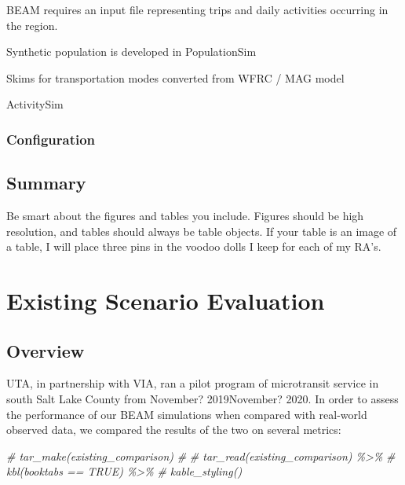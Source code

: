 \documentclass[
]{article}
\newenvironment{Shaded}{\begin{snugshade}}{\end{snugshade}}
\newcommand{\CommentTok}[1]{\textcolor[rgb]{0.56,0.35,0.01}{\textit{#1}}}
\begin{document}
BEAM requires an input file representing trips and daily activities occurring in the region.

Synthetic population is developed in PopulationSim

Skims for transportation modes converted from WFRC / MAG model

ActivitySim

\hypertarget{configuration}{%
\subsubsection{Configuration}\label{configuration}}

\hypertarget{summary-1}{%
\subsection{Summary}\label{summary-1}}

Be smart about the figures and tables you include. Figures should be high resolution, and tables should always be table objects. If your table is an image of a table, I will place three pins in the voodoo dolls I keep for each of my RA's.

\hypertarget{existing-scenario-evaluation}{%
\section{Existing Scenario Evaluation}\label{existing-scenario-evaluation}}

\hypertarget{overview-2}{%
\subsection{Overview}\label{overview-2}}

UTA, in partnership with VIA, ran a pilot program of microtransit service in south Salt Lake County from November? 2019\textendash November? 2020. In order to assess the performance of our BEAM simulations when compared with real-world observed data, we compared the results of the two on several metrics:

\begin{Shaded}
\begin{Highlighting}[]
\CommentTok{\# tar\_make(existing\_comparison)}
\CommentTok{\# }
\CommentTok{\# tar\_read(existing\_comparison) \%\textgreater{}\% }
\CommentTok{\#   kbl(booktabs == TRUE) \%\textgreater{}\% }
\CommentTok{\#   kable\_styling()}
\end{Highlighting}
\end{Shaded}
\end{document}
